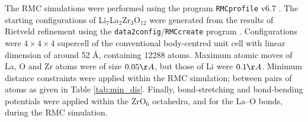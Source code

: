 \documentclass[twoside,twocolumn,9pt]{article}
\begin{document}
The RMC simulations were performed using the program \texttt{RMCprofile} v6.7 \cite{Tucker:2007eh}. 
The starting configurations of Li$_7$La$_2$Zr$_3$O$_{12}$ were generated from the results of Rietveld refinement using the \texttt{data2config}/\texttt{RMCcreate} program \cite{Dove:2013gk}. Configurations were $4\times 4\times 4$ supercell of the conventional body-centred unit cell with linear dimension of around 52 \AA, containing 12288 atoms. Maximum atomic moves of La, O and Zr atoms were of size $0.05 \AA$, but those of Li were $0.1 \AA$. Minimum distance constraints were applied within the RMC simulation; between  pairs of atoms as given in Table  \ref{tab:min_dis}. Finally, bond-stretching and bond-bending potentials were applied within the ZrO$_6$ octahedra, and for the La--O bonds, during the RMC simulation.
\end{document}
